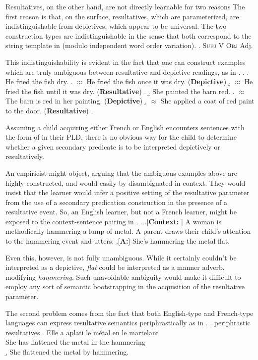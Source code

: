 \documentclass[MilwayThesis]{subfiles}
\begin{document}
Resultatives, on the other hand, are not directly learnable for two reasons
The first reason is that, on the surface, resultatives, which are parameterized, are indistinguishable from depictives, which appear to be universal.
The two construction types are indistinguishable in the sense that both correspond to the string template in \Next (modulo independent word order variation).
\ex. \textsc{Subj} V \textsc{Obj} Adj.

This indistinguishability is evident in the fact that one can construct examples which are truly ambiguous between resultative and depictive readings, as in \Next.
\ex. 
\a. He fried the fish dry.
\a. $\approx$ He fried the fish once it was dry. (\textbf{Depictive})
\b. $\approx$ He fried the fish until it was dry. (\textbf{Resultative})
\z.
\b. She painted the barn red.
\a. $\approx$ The barn is red in her painting. (\textbf{Depictive})
\b. $\approx$ She applied a coat of red paint to the door. (\textbf{Resultative})
\z.

Assuming a child acquiring either French or English encounters sentences with the form of \LLast in their PLD, there is no obvious way for the child to determine whether a given secondary predicate is to be interpreted depictively or resultatively.

An empiricist might object, arguing that the ambiguous examples above are highly constructed, and would easily by disambiguated in context.
They would insist that the learner would infer a positive setting of the resultative parameter from the use of a secondary predication construction in the presence of a resultative event.
So, an English learner, but not a French learner, might be exposed to the context-sentence pairing in \Next.
\ex. 
\a.[\textbf{Context:} ] A woman is methodically hammering a lump of metal.
A parent draws their child's attention to the hammering event and utters:
\b.[\textbf{A:}] She's hammering the metal flat.

Even this, however, is not fully unambiguous.
While it certainly couldn't be interpreted as a depictive, \textit{flat} could be interpreted as a manner adverb, modifying \textit{hammering}.
Such unavoidable ambiguity would make it difficult to employ any sort of semantic bootstrapping in the acquisition of the resultative parameter.

The second problem comes from the fact that both English-type and French-type languages can express resultative semantics periphrastically as in \Next.
\ex. periphrastic resultatives
\ag. Elle a aplati le m\'etal en le martelant\\
She has flattened the metal in the hammering\\
\b. She flattened the metal by hammering.
\end{document}
